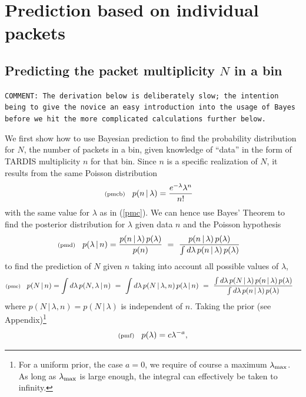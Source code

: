 \documentclass[11pt]{article}
\newcommand{\lleq}[1]{\label{#1} }
\renewcommand{\lleq}[1]{\label{#1} {\scriptstyle {\rm (#1)}} \hspace*{2ex} }
\newcommand{\cond}{\,|\,}
\begin{document}
\section{Prediction based on individual packets}


\subsection{Predicting the packet multiplicity $N$ in a bin}

\texttt{COMMENT: The derivation below is deliberately slow; the
  intention being to give the novice an easy introduction into the
  usage of Bayes before we hit the more complicated calculations
  further below.}

We first show how to use Bayesian prediction to find the probability
distribution for $N$, the number of packets in a bin, given knowledge
of ``data'' in the form of TARDIS multiplicity $n$ for that bin.
Since $n$ is a specific
realization of $N$, it results from the same Poisson distribution
\begin{align}
  \lleq{pmcb}
   p(n\cond\lambda) &= \frac{e^{-\lambda}\lambda^n}{n!}
\end{align}
with the same value for $\lambda$ as in (\ref{pmc}).  We can hence use
Bayes' Theorem to find the posterior distribution for $\lambda$ given
data $n$ and the Poisson hypothesis
\begin{align}
  \lleq{pmd}
  p(\lambda\cond n) %
  &= \frac{p(n\cond\lambda)\,p(\lambda)} {p(n)}
  \ =\ \frac{p(n\cond\lambda)\,p(\lambda)} %
  {\int d\lambda\, p(n\cond\lambda)\,p(\lambda)}
\end{align}
to find the prediction of $N$ given $n$ taking into account all
possible values of $\lambda$,
\begin{align}
  \lleq{pme}
  p(N\cond n)
  &= \int d\lambda\,p(N,\lambda\cond n)
  \ =\ \int d\lambda\,p(N\cond\lambda, n)\,p(\lambda\cond n)
  \ =\ \frac{\int d\lambda\,p(N\cond\lambda)\,p(n\cond\lambda)\,p(\lambda)}
  {\int d\lambda\, p(n\cond\lambda)\,p(\lambda)}
\end{align}
where $p(N\cond\lambda,n) = p(N\cond\lambda)$ is independent of $n$.
Taking the prior (see Appendix)\footnote{For a uniform prior,
  the case $a{=}0$, we require of course a maximum $\lambda_{\rm
    max}$. As long as $\lambda_{\rm max}$ is large enough, the
  integral can effectively be taken to infinity.}
\begin{align}
  \lleq{pmf}
  p(\lambda) = c\lambda^{-a},
\end{align}
\end{document}
